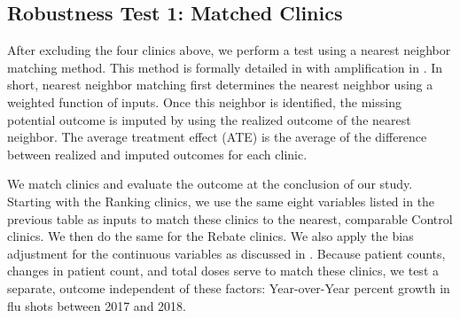 \begin{table}[htbp]
\end{table}%

\subsection*{Robustness Test 1: Matched Clinics} 
After excluding the four clinics above, we perform a test using a nearest neighbor matching method. This method is formally detailed in \cite{Abadie2006} with amplification in \cite{Abadie2011}. In short, nearest neighbor matching first determines the nearest neighbor using a weighted function of inputs. Once this neighbor is identified, the missing potential outcome is imputed by using the realized outcome of the nearest neighbor. The average treatment effect (ATE) is the average of the difference between realized and imputed outcomes for each clinic.

We match clinics and evaluate the outcome at the conclusion of our study. Starting with the Ranking clinics, we use the same eight variables listed in the previous table as inputs to match these clinics to the nearest, comparable Control clinics. We then do the same for the Rebate clinics. We also apply the bias adjustment for the continuous variables as discussed in \cite{Abadie2011}. Because patient counts, changes in patient count, and total doses serve to match these clinics, we test a separate, outcome independent of these factors: Year-over-Year percent growth in flu shots between 2017 and 2018. 

\begin{table}[htbp]
\end{table}%

